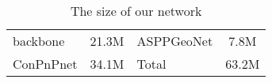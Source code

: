 \begin{table}[t]
        \centering
        \caption{
                The size of our network
        }
        \begin{tabular}{l c l c}
        \toprule
        backbone&21.3M&ASPPGeoNet&7.8M \\
        ConPnPnet&34.1M& Total & 63.2M \\
        \bottomrule
        \end{tabular}
\label{tab:network_size}
\end{table}
